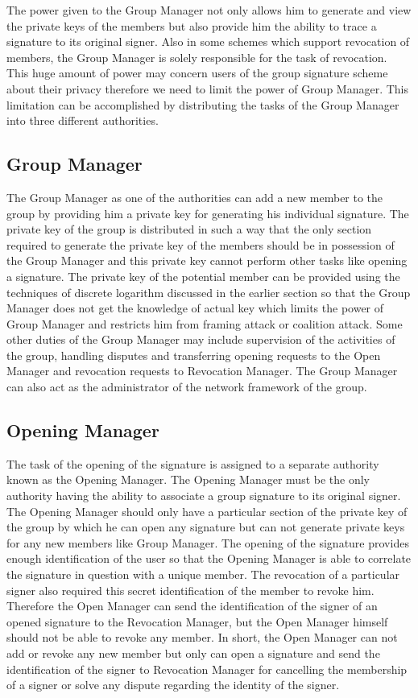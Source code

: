 The power given to the Group Manager not only allows him to generate and view the private keys of the members but also provide him the ability to trace a signature to its original signer. Also in some schemes which support revocation of members, the Group Manager is solely responsible for the task of revocation. This huge amount of power may concern users of the group signature scheme about their privacy therefore we need to limit the power of Group Manager. This limitation can be accomplished by distributing the tasks of the Group Manager into three different authorities. 

\subsection{Group Manager}
The Group Manager as one of the authorities can add a new member to the group by providing him a private key for generating his individual signature. The private key of the group is distributed in such a way that the only section required to generate the private key of the members should be in possession of the Group Manager and this private key cannot perform other tasks like opening a signature. The private key of the potential member can be provided using the techniques of discrete logarithm discussed in the earlier section so that the Group Manager does not get the knowledge of actual key which limits the power of Group Manager and restricts him from framing attack or coalition attack. Some other duties of the Group Manager may include supervision of the activities of the group, handling disputes and transferring opening requests to the Open Manager and revocation requests to Revocation Manager. The Group Manager can also act as the administrator of the network framework of the group.

\subsection{Opening Manager}
The task of the opening of the signature is assigned to a separate authority known as the Opening Manager. The Opening Manager must be the only authority having the ability to associate a group signature to its original signer. The Opening Manager should only have a particular section of the private key of the group by which he can open any signature but can not generate private keys for any new members like Group Manager. The opening of the signature provides enough identification of the user so that the Opening Manager is able to correlate the signature in question with a unique member. The revocation of a particular signer also required this secret identification of the member to revoke him. Therefore the Open Manager can send the identification of the signer of an opened signature to the Revocation Manager, but the Open Manager himself should not be able to revoke any member. In short, the Open Manager can not add or revoke any new member but only can open a signature and send the identification of the signer to Revocation Manager for cancelling the membership of a signer or solve any dispute regarding the identity of the signer. 

